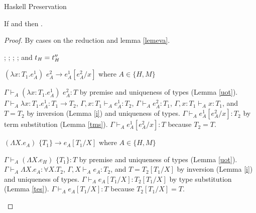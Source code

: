 \begin{theorem}{Haskell Preservation}

\label{thmpnh}

If \judeh{}{\first{\varexph}}{\first{\vartyh}} and \redrule{\first{\varexph}}{\second{\varexph}} then \judeh{}{\second{\varexph}}{\first{\vartyh}}.

\begin{proof}

By cases on the reduction \redrule{\first{\varexph}}{\second{\varexph}} and lemma \ref{lemeva}.


\begin{case}{\osfapph}

\pnpremise
{\judeh{}{\osfapplh}{\second{\vartyh}}}
\pntypes
{
\judeh{}{\expfabss{\first{\varvarh}}{\first{\vartyh}}{\first{\varexph}}}{\tyfun{\first{\vartyh}}{\second{\vartyh}}};
\judeh{\envexte{\envempty}{\first{\varvarh}}{\first{\vartyh}}}{\first{\varexph}}{\second{\vartyh}};
\judeh{}{\second{\varexph}}{\first{\vartyh}};
\judeh{\envexte{\envempty}{\first{\varvarh}}{\first{\vartyh}}}{\first{\varvarh}}{\first{\vartyh}}; and
$t_{\mathit{H}} = t_{\mathit{H}}''$
}


$(\lambda x:T_{1}.e_{A}^{1})$ $e_{A}^{2}\rightarrow e_{A}^{1}[e_{A}^{2}/x]$ where $A\in\lbrace H,M\rbrace$

$\Gamma\vdash_{A}(\lambda x:T_{1}.e_{A}^{1})$ $e_{A}^{2}:T$ by premise and uniqueness of types (Lemma \ref{uot}).  $\Gamma\vdash_{A}\lambda x:T_{1}.e_{A}^{1}:T_{1}\rightarrow T_{2}$, $\Gamma,x:T_{1}\vdash_{A}e_{A}^{1}:T_{2}$, $\Gamma\vdash_{A}e_{A}^{2}:T_{1}$, $\Gamma,x:T_{1}\vdash_{A}x:T_{1}$, and $T=T_{2}$ by inversion (Lemma \ref{i}) and uniqueness of types.  $\Gamma\vdash_{A}e_{A}^{1}[e_{A}^{2}/x]:T_{2}$ by term substitution (Lemma \ref{tms}).  $\Gamma\vdash_{A}e_{A}^{1}[e_{A}^{2}/x]:T$ because $T_{2}=T$.
\end{case}


\begin{case}{\ostapp}

$(\Lambda X.e_{A})$ $\lbrace T_{1}\rbrace\rightarrow e_{A}[T_{1}/X]$ where $A\in\lbrace H,M\rbrace$

$\Gamma\vdash_{A}(\Lambda X.e_{H})$ $\lbrace T_{1}\rbrace:T$ by premise and uniqueness of types (Lemma \ref{uot}).  $\Gamma\vdash_{A}\Lambda X.e_{A}:\forall X.T_{2}$, $\Gamma,X\vdash_{A}e_{A}:T_{2}$, and $T=T_{2}[T_{1}/X]$ by inversion (Lemma \ref{i}) and uniqueness of types.  $\Gamma\vdash_{A}e_{A}[T_{1}/X]:T_{2}[T_{1}/X]$ by type substitution (Lemma \ref{tes}).  $\Gamma\vdash_{A}e_{A}[T_{1}/X]:T$ because $T_{2}[T_{1}/X]=T$.
\end{case}


\end{proof}
\end{theorem}
